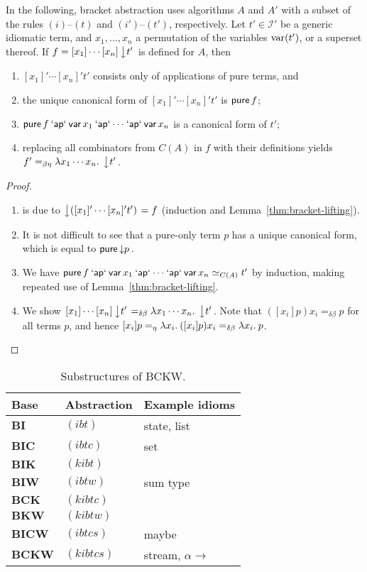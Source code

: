\begin{theorem}\label{thm:unlifting}
In the following, bracket abstraction uses algorithms $A$ and $A'$ with
a subset of the rules $(i)$--$(t)$ and $(i')$--$(t')$, respectively.
Let $t' \in \mathcal{I}'$ be a generic idiomatic term, and $x_1,\dots,x_n$
a permutation of the variables $\operatorname{var}(t')$, or a superset thereof.
If $f = [x_1]\cdots[x_n]\left\downarrow t'\right.$ is defined for $A$, then
\begin{enumerate}\raggedright
\item $[x_1]'\cdots[x_n]'t'$ consists only of applications of pure terms, and
\item the unique canonical form of $[x_1]'\cdots[x_n]'t'$ is $\operatorname{\mathsf{pure}} f$;
\item $\operatorname{\mathsf{pure}} f \mathbin{\mathsf{`ap`}} \operatorname{\mathsf{var}} x_1 \mathbin{\mathsf{`ap`}} \cdots \mathbin{\mathsf{`ap`}} \operatorname{\mathsf{var}} x_n$ is a canonical
	form of $t'$;
\item replacing all combinators from $C(A)$ in $f$ with their definitions
	yields $f' =_{\beta\eta} \lambda x_1\cdots x_n.\>\left\downarrow t'\right.$.
\end{enumerate}
\end{theorem}
\begin{proof}
\begin{enumerate}
\item is due to $\left\downarrow ([x_1]'\cdots[x_n]'t')\right. = f$ (induction and
	Lemma~\ref{thm:bracket-lifting}).
\item It is not difficult to see that a pure-only term $p$ has a unique canonical
	form, which is equal to $\operatorname{\mathsf{pure}} \left\downarrow p\right.$.
\item We have $\operatorname{\mathsf{pure}} f \mathbin{\mathsf{`ap`}} \operatorname{\mathsf{var}} x_1 \mathbin{\mathsf{`ap`}} \cdots \mathbin{\mathsf{`ap`}} \operatorname{\mathsf{var}} x_n \simeq_{C(A)} t'$
	by induction, making repeated use of Lemma~\ref{thm:bracket-lifting}.
\item We show $[x_1]\cdots[x_n]\left\downarrow t'\right. =_{\delta\beta} \lambda x_1\cdots x_n.\>\left\downarrow t'\right.$.
	Note that $([x_i]p)x_i =_{\delta\beta} p$ for all terms $p$, and hence
	$[x_i]p =_\eta \lambda x_i.\>([x_i]p)x_i =_{\delta\beta} \lambda x_i.\>p$.
\end{enumerate}
\end{proof}

\begin{table}\centering
\begin{tabular}{lll} Base & Abstraction & Example idioms \\
\hline
$\mathbf{BI}$ & $(ibt)$ & state, list \\
$\mathbf{BIC}$ & $(ibtc)$ & set \\
$\mathbf{BIK}$ & $(kibt)$ & \\
$\mathbf{BIW}$ & $(ibtw)$ & sum type \\
$\mathbf{BCK}$ & $(kibtc)$ & \\
$\mathbf{BKW}$ & $(kibtw)$ & \\
$\mathbf{BICW}$ & $(ibtcs)$ & maybe \\
$\mathbf{BCKW}$ & $(kibtcs)$ & stream, $\alpha \to$ \\
\end{tabular}
\caption{Substructures of BCKW.}
\label{tab:combinator-bases}
\end{table}

